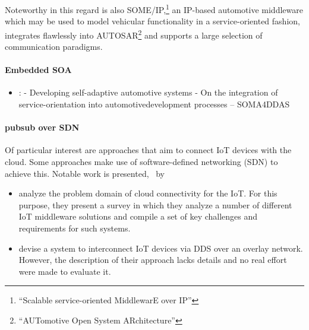 Noteworthy in this regard is also SOME/IP,\footnote{``Scalable service-oriented MiddlewarE over IP''} an IP-based automotive middleware which may be used to model vehicular functionality in a service-oriented fashion, integrates flawlessly into AUTOSAR\footnote{``AUTomotive Open System ARchitecture''} and supports a large selection of communication paradigms.


\paragraph{Embedded SOA}

\begin{itemize}
\item \cite{wagner2014developing}: \citeauthor*{wagner2014developing} - Developing self-adaptive automotive systems - On the integration of service-orientation into automotivedevelopment processes -- SOMA4DDAS
\end{itemize}


\paragraph{pubsub over SDN}
Of particular interest are approaches that aim to connect IoT devices with the cloud. Some approaches make use of software-defined networking (SDN) to achieve this. Notable work is presented, \eg \ by
\begin{itemize}
	\item \citeauthor*{farahzadi2017middleware} \cite{farahzadi2017middleware} analyze the problem domain of cloud connectivity for the IoT. For this purpose, they present a survey in which they analyze a number of different IoT middleware solutions and compile a set of key challenges and requirements for such systems.
	\item \citeauthor*{hakiri2015publish} \cite{hakiri2015publish} devise a system to interconnect IoT devices via DDS over an overlay network. However, the description of their approach lacks details and no real effort were made to evaluate it.
\end{itemize}


